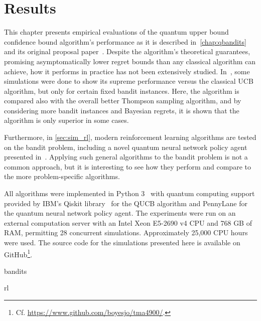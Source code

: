 \chapter{Results}
\label{chap:simulations}

This chapter presents empirical evaluations of the quantum upper bound confidence bound algorithm's performance as it is described in~\cref{chap:qbandits} and its original proposal paper~\autocite{wan2022}.
Despite the algorithm's theoretical guarantees, promising asymptomatically lower regret bounds than any classical algorithm can achieve, how it performs in practice has not been extensively studied.
In~\autocite{wan2022}, some simulations were done to show its supreme performance versus the classical UCB algorithm, but only for certain fixed bandit instances.
Here, the algorithm is compared also with the overall better Thompson sampling algorithm, and by considering more bandit instances and Bayesian regrets, it is shown that the algorithm is only superior in some cases.

Furthermore, in \cref{sec:sim_rl}, modern reinforcement learning algorithms are tested on the bandit problem, including a novel quantum neural network policy agent presented in~\autocite{jerbi2021a}.
Applying such general algorithms to the bandit problem is not a common approach, but it is interesting to see how they perform and compare to the more problem-specific algorithms.

All algorithms were implemented in Python 3~\autocite{python} with quantum computing support provided by IBM's Qiskit library~\autocite{qiskit} for the QUCB algorithm and PennyLane for the quantum neural network policy agent.
The experiments were run on an external computation server with an Intel Xeon E5-2690 v4 CPU and 768 GB of RAM, permitting 28 concurrent simulations.
Approximately 25,000 CPU hours were used.
The source code for the simulations presented here is available on GitHub\footnote{
    Cf. \url{https://www.github.com/boyesjo/tma4900/}.
}.

\clearpage


{bandits}
\clearpage



{rl}

\clearpage
